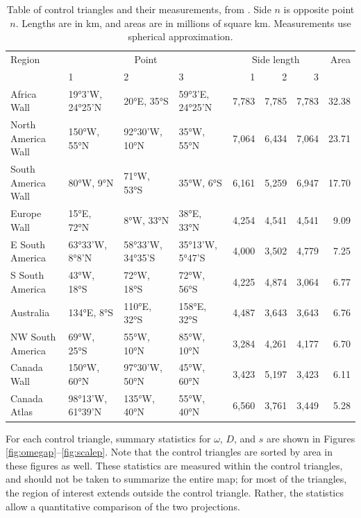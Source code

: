 \documentclass[]{interact}
\begin{document}
\begin{table}
\begin{tabular}{ p{2.5cm} | p{1.5cm} p{1.5cm} p{1.5cm} | r r r | r }
Region & \multicolumn{3}{c}{Point} & \multicolumn{3}{c}{Side length} & Area \\
& 1 & 2 & 3 & 1 & 2 & 3 & \\
\hline
Africa Wall & 19°3'W, 24°25'N & 20°E, 35°S & 59°3'E, 24°25'N & 7,783 & 7,785 & 7,783 & 32.38 \\
North \mbox{America} Wall & 150°W, 55°N & 92°30'W, 10°N & 35°W, 55°N & 7,064 & 6,434 & 7,064 & 23.71 \\
South \mbox{America} Wall & 80°W, 9°N & 71°W, 53°S & 35°W, 6°S & 6,161 & 5,259 & 6,947 & 17.70 \\
Europe Wall & 15°E, 72°N & 8°W, 33°N & 38°E, 33°N & 4,254 & 4,541 & 4,541 & 9.09 \\
E South \mbox{America} & 63°33'W, 8°8'N & 58°33'W, 34°35'S & 35°13'W, 5°47'S & 4,000 & 3,502 & 4,779 & 7.25 \\
S South \mbox{America} & 43°W, 18°S & 72°W, 18°S & 72°W, 56°S & 4,225 & 4,874 & 3,064 & 6.77 \\
Australia & 134°E, 8°S & 110°E, 32°S & 158°E, 32°S & 4,487 & 3,643 & 3,643 & 6.76 \\
NW South \mbox{America} & 69°W, 25°S & 55°W, 10°N & 85°W, 10°N & 3,284 & 4,261 & 4,177 & 6.70 \\
Canada Wall & 150°W, 60°N & 97°30'W, 50°N & 45°W, 60°N & 3,423 & 5,197 & 3,423 & 6.11 \\
Canada \mbox{Atlas} & 98°13'W, 61°39'N & 135°W, 40°N & 55°W, 40°N & 6,560 & 3,761 & 3,449 & 5.28
\end{tabular}
\caption{Table of control triangles and their measurements, from
\citet{christensen}. Side $n$ is opposite point $n$. Lengths are in km, and
areas are in millions of square km. Measurements use spherical approximation.}
\label{table:ctrlpts}
\end{table}

For each control triangle, summary statistics for $\omega$, $D$, and $s$ are
shown in Figures \ref{fig:omegap}--\ref{fig:scalep}. Note that the control
triangles are sorted by area in these figures as well.
These statistics are measured within the control triangles,
and should not be taken to summarize the entire map; for most of the triangles,
the region of interest extends outside the control triangle.
Rather, the statistics allow a quantitative comparison of the two projections.
\end{document}
